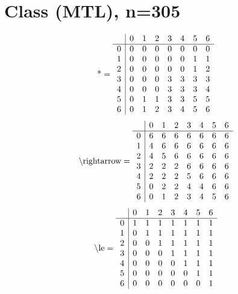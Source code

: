 \documentclass[11pt]{article}
\begin{document}
\section{Class (MTL), n=305}
\[\text{*} = 
\begin{array}{r | r r r r r r r}
 & 0 & 1 & 2 & 3 & 4 & 5 & 6 \\ \hline
0 & 0 & 0 & 0 & 0 & 0 & 0 & 0 \\
1 & 0 & 0 & 0 & 0 & 0 & 1 & 1 \\
2 & 0 & 0 & 0 & 0 & 0 & 1 & 2 \\
3 & 0 & 0 & 0 & 3 & 3 & 3 & 3 \\
4 & 0 & 0 & 0 & 3 & 3 & 3 & 4 \\
5 & 0 & 1 & 1 & 3 & 3 & 5 & 5 \\
6 & 0 & 1 & 2 & 3 & 4 & 5 & 6 \\
\end{array}
\]
\[\text{\textbackslash rightarrow} = 
\begin{array}{r | r r r r r r r}
 & 0 & 1 & 2 & 3 & 4 & 5 & 6 \\ \hline
0 & 6 & 6 & 6 & 6 & 6 & 6 & 6 \\
1 & 4 & 6 & 6 & 6 & 6 & 6 & 6 \\
2 & 4 & 5 & 6 & 6 & 6 & 6 & 6 \\
3 & 2 & 2 & 2 & 6 & 6 & 6 & 6 \\
4 & 2 & 2 & 2 & 5 & 6 & 6 & 6 \\
5 & 0 & 2 & 2 & 4 & 4 & 6 & 6 \\
6 & 0 & 1 & 2 & 3 & 4 & 5 & 6 \\
\end{array}
\]
\[\text{\textbackslash le} = 
\begin{array}{r | r r r r r r r}
 & 0 & 1 & 2 & 3 & 4 & 5 & 6 \\ \hline
0 & 1 & 1 & 1 & 1 & 1 & 1 & 1 \\
1 & 0 & 1 & 1 & 1 & 1 & 1 & 1 \\
2 & 0 & 0 & 1 & 1 & 1 & 1 & 1 \\
3 & 0 & 0 & 0 & 1 & 1 & 1 & 1 \\
4 & 0 & 0 & 0 & 0 & 1 & 1 & 1 \\
5 & 0 & 0 & 0 & 0 & 0 & 1 & 1 \\
6 & 0 & 0 & 0 & 0 & 0 & 0 & 1 \\
\end{array}
\]
\end{document}
